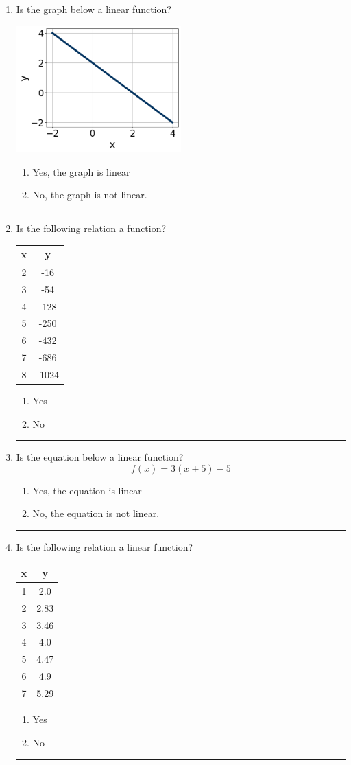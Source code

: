 \documentclass[14pt]{extbook}
\newcommand{\litem}[1]{\item#1\hspace*{-1cm}\rule{\textwidth}{0.4pt}}
\begin{document}
\begin{enumerate}
{\begin{enumerate}[label=\Alph*.]
\end{enumerate} }
\litem{
Is the graph below a linear function?
\begin{center}
    \includegraphics[width=0.5\textwidth]{../Figures/MA_8_F_1_2_graphL.png}
\end{center}
\begin{enumerate}[label=\Alph*.]
\item Yes, the graph is linear
\item No, the graph is not linear.

\end{enumerate} }
\litem{
Is the following relation a function?

\begin{tabular}{c|c}
x &y\tabularnewline \hline
2 &-16\tabularnewline \hline
3 &-54\tabularnewline \hline
4 &-128\tabularnewline \hline
5 &-250\tabularnewline \hline
6 &-432\tabularnewline \hline
7 &-686\tabularnewline \hline
8 &-1024\end{tabular}\begin{enumerate}[label=\Alph*.]
\item Yes
\item No

\end{enumerate} }
\litem{
Is the equation below a linear function?\[ f(x) = 3(x + 5)-5 \]\begin{enumerate}[label=\Alph*.]
\item Yes, the equation is linear
\item No, the equation is not linear.

\end{enumerate} }
\litem{
Is the following relation a linear function?

\begin{tabular}{c|c}
x &y\tabularnewline \hline
1 &2.0\tabularnewline \hline
2 &2.83\tabularnewline \hline
3 &3.46\tabularnewline \hline
4 &4.0\tabularnewline \hline
5 &4.47\tabularnewline \hline
6 &4.9\tabularnewline \hline
7 &5.29\end{tabular}\begin{enumerate}[label=\Alph*.]
\item Yes
\item No


\end{enumerate}}
\end{enumerate}
\end{document}
